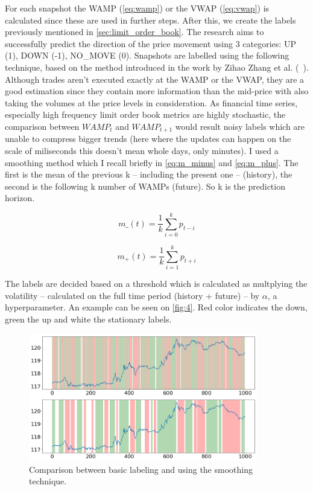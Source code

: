 \documentclass[11pt,a4paper,oneside]{article}
\begin{document}
  For each snapshot the WAMP (\ref{eq:wamp}) or the VWAP (\ref{eq:vwap}) is calculated since these are used in further 
  steps. After this, we create the labels previously mentioned in \ref{sec:limit_order_book}. The research aims to 
  successfully predict the direction of the price movement using 3 categories: UP (1), DOWN (-1), NO\_MOVE (0). 
  Snapshots are labelled using the following technique, based on the method introduced in the work by Zihao Zhang et al. 
  (~\cite{deeplob}). Although trades aren't executed exactly at the WAMP or the VWAP, they are a good estimation since 
  they contain more information than the mid-price with also taking the volumes at the price levels in consideration. 
  As financial time series, especially high frequency limit order book metrics are highly stochastic, the comparison 
  between $WAMP_t$ and $WAMP_{t+1}$ would result noisy labels which are unable to compress bigger trends (here where the
  updates can happen on the scale of miliseconds this doesn't mean whole days, only minutes). I used a smoothing method 
  which I recall briefly in \autoref{eq:m_minus} and \autoref{eq:m_plus}. The first is the mean of the previous k –
  including the present one – (history), the second is the following k number of WAMPs (future). So k is the prediction 
  horizon. 

  \begin{equation}
    m\_(t) = \frac{1}{k}\sum_{i=0}^{k}p_{t-i}
    \label{eq:m_minus}
  \end{equation}

  \begin{equation}
    m_+(t) = \frac{1}{k}\sum_{i=1}^{k}p_{t+i}
    \label{eq:m_plus}
  \end{equation}

  The labels are decided based on a threshold which is calculated as multplying the volatility – calculated on the full 
  time period (history + future) – by $\alpha$, a hyperparameter. An example can be seen on \autoref{fig:4}. Red color 
  indicates the down, green the up and white the stationary labels.

  \begin{figure}[tbh]
    \centering
    \includegraphics[width=10cm]{labels.png}
    \caption{Comparison between basic labeling and using the smoothing technique.}
    \label{fig:4}
  \end{figure}
\end{document}
